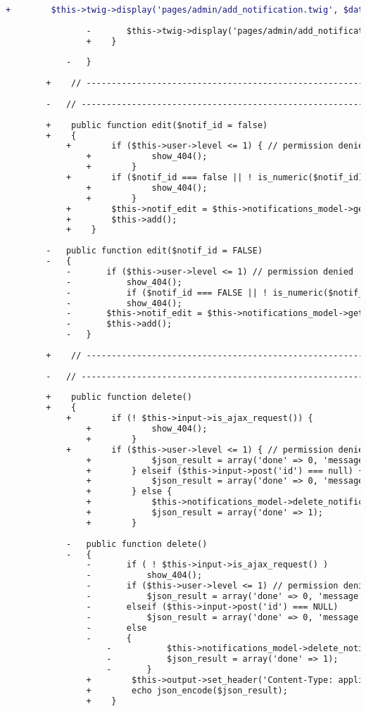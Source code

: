 \begin{lstlisting}[language=diff, caption=Perubahan pada kode Notifications.php]
				+        $this->twig->display('pages/admin/add_notification.twig', $data);
				
				-		$this->twig->display('pages/admin/add_notification.twig', $data);
				+    }
			
			-	}
		
		+    // ------------------------------------------------------------------------
		
		-	// ------------------------------------------------------------------------
		
		+    public function edit($notif_id = false)
		+    {
			+        if ($this->user->level <= 1) { // permission denied
				+            show_404();
				+        }
			+        if ($notif_id === false || ! is_numeric($notif_id)) {
				+            show_404();
				+        }
			+        $this->notif_edit = $this->notifications_model->get_notification($notif_id);
			+        $this->add();
			+    }
		
		-	public function edit($notif_id = FALSE)
		-	{
			-		if ($this->user->level <= 1) // permission denied
			-			show_404();
			-			if ($notif_id === FALSE || ! is_numeric($notif_id))
			-			show_404();
			-		$this->notif_edit = $this->notifications_model->get_notification($notif_id);
			-		$this->add();
			-	}
		
		+    // ------------------------------------------------------------------------
		
		-	// ------------------------------------------------------------------------
		
		+    public function delete()
		+    {
			+        if (! $this->input->is_ajax_request()) {
				+            show_404();
				+        }
			+        if ($this->user->level <= 1) { // permission denied
				+            $json_result = array('done' => 0, 'message' => 'Permission Denied');
				+        } elseif ($this->input->post('id') === null) {
				+            $json_result = array('done' => 0, 'message' => 'Input Error');
				+        } else {
				+            $this->notifications_model->delete_notification($this->input->post('id'));
				+            $json_result = array('done' => 1);
				+        }
			
			-	public function delete()
			-	{
				-		if ( ! $this->input->is_ajax_request() )
				-			show_404();
				-		if ($this->user->level <= 1) // permission denied
				-			$json_result = array('done' => 0, 'message' => 'Permission Denied');
				-		elseif ($this->input->post('id') === NULL)
				-			$json_result = array('done' => 0, 'message' => 'Input Error');
				-		else
				-		{
					-			$this->notifications_model->delete_notification($this->input->post('id'));
					-			$json_result = array('done' => 1);
					-		}
				+        $this->output->set_header('Content-Type: application/json; charset=utf-8');
				+        echo json_encode($json_result);
				+    }
			

\end{lstlisting}
